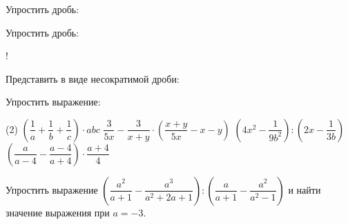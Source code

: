 \begin{exam}
	\begin{listofex}
	\item Упростить дробь:
	\begin{itasks}[3]
		\task {}
		\task {}
		\task {}
	\end{itasks}
	\item Упростить дробь:
	\begin{itasks}[3]
		\task {}
		\task {}
		\task {}
		\task {}
		\task! 
	\end{itasks}
	\item {}
	\item Представить в виде несократимой дроби:
	\begin{itasks}[3]
		\task {}
		\task {}
		\task {}
	\end{itasks}
	\item Упростить выражение:
	\begin{tasks}(2)
		\task \( \left( \dfrac{1}{a}+\dfrac{1}{b}+\dfrac{1}{c} \right)\cdot abc \)
		\task \( \dfrac{3}{5x}-\dfrac{3}{x+y}\cdot\left( \dfrac{x+y}{5x}-x-y \right) \)
		\task \( \left( 4x^2-\dfrac{1}{9b^2} \right):\left( 2x-\dfrac{1}{3b} \right) \)
		\task \( \left( \dfrac{a}{a-4}-\dfrac{a-4}{a+4} \right)\cdot\dfrac{a+4}{4} \)
	\end{tasks}
	\item Упростить выражение \( \left( \dfrac{a^2}{a+1}-\dfrac{a^3}{a^2+2a+1} \right):\left( \dfrac{a}{a+1}-\dfrac{a^2}{a^2-1} \right) \) и найти значение выражения при \( a=-3 \).
	\end{listofex}
\end{exam}
